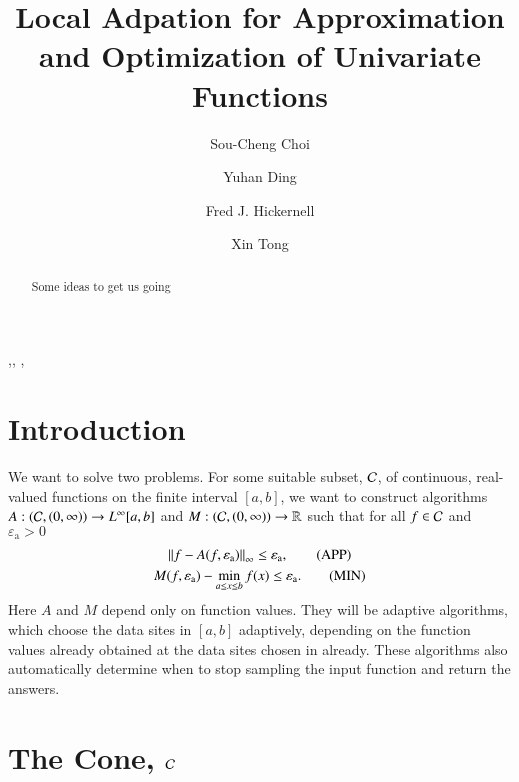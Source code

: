 \documentclass[review]{elsarticle}
\newcommand{\abstol}{\varepsilon_{\textrm{a}}}
\theoremstyle{definition}
\begin{document}
\begin{frontmatter}

\title{Local Adpation for Approximation and Optimization of Univariate Functions}


\author{Sou-Cheng Choi}
\author{Yuhan Ding}
\author{Fred J. Hickernell}
\author{Xin Tong}
\address{Department of Applied Mathematics, Illinois Institute of Technology, RE 208, 10 West 32$^{\text{nd}}$ Street, Chicago, Illinois, 60616, USA}

\begin{abstract}
Some ideas to get us going
\end{abstract}

\begin{keyword}
\sep \sep
\MSC[2010]  \sep
\end{keyword}

\end{frontmatter}

\section{Introduction} \label{sec:intro}

We want to solve two problems. For some suitable subset, $\mathcal{C}$, of continuous,
real-valued functions on the finite interval $[a,b]$, we want to construct 
algorithms $A:(\mathcal{C},(0,\infty)) \to L^{\infty}[a,b]$ and $M: (\mathcal{C},(0,\infty)) \to
\mathbb{R}$ such that for all $f \in \mathcal{C}$ and $\abstol > 0$
\begin{gather}
\norm[\infty]{f - A(f,\abstol)} \le \abstol,  \tag{APP} \label{appxprob} \\
M(f,\abstol) - \min_{a \le x \le b} f(x)  \le \abstol. \tag{MIN} \label{optprob}
\end{gather}
Here $A$ and $M$ depend only on function values. They will be adaptive 
algorithms, which choose the data sites in $[a,b]$ adaptively, depending on the
function values already obtained at the data sites chosen in already. These
algorithms also automatically determine when to stop sampling the input function
and return the answers.



\section{The Cone, $\mathcal{C}$} \label{sec:cone}
\end{document}
